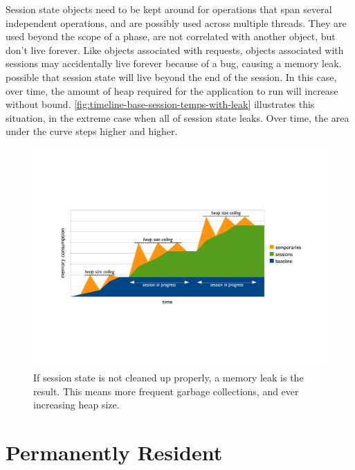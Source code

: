 Session state objects need to be kept around for operations that span
several independent operations, and are possibly used across multiple threads.
They are used beyond the scope of a phase, are not correlated with another
object, but don't live forever.
Like objects associated with requests, objects associated with sessions may
accidentally live forever because of a bug, causing a memory leak.
possible that session state will live beyond the end of the session.  In this
case, over time, the amount of heap required for the application to run will increase without bound.
\autoref{fig:timeline-base-session-temps-with-leak} illustrates this situation,
in the extreme case when all of session state leaks. Over time, the area under
the curve steps higher and higher.

\begin{figure}[h]  %
	\centering
	\includegraphics[width=\textwidth]{part2/Figures/lifetime/timeline-base-session-temps-with-leak}
	\caption{If session state is not cleaned up
	properly, a memory leak is the result. This means more frequent garbage
	collections, and ever increasing heap size.}
	\label{fig:timeline-base-session-temps-with-leak}
\end{figure}


\section{Permanently Resident}
\label{sec:forever-lifetime}

